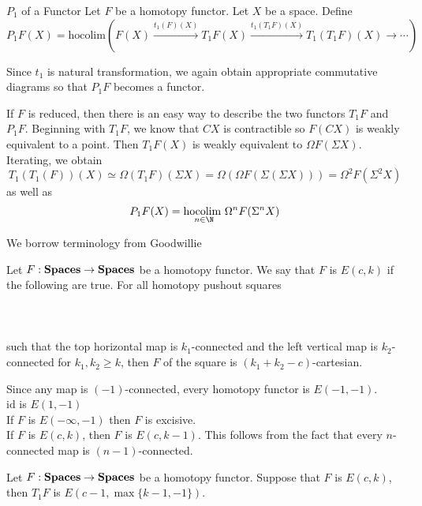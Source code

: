 \documentclass[a4paper]{article}
\begin{document}
\begin{defn}{$P_1$ of a Functor}{} Let $F$ be a homotopy functor. Let $X$ be a space. Define $$P_1F(X)=\text{hocolim}(F(X)\overset{t_1(F)(X)}{\rightarrow}T_1F(X)\overset{t_1(T_1F)(X)}{\rightarrow}T_1(T_1F)(X)\rightarrow\cdots)$$
\end{defn}

Since $t_1$ is natural transformation, we again obtain appropriate commutative diagrams so that $P_1F$ becomes a functor. 

\begin{eg}{}{} If $F$ is reduced, then there is an easy way to describe the two functors $T_1F$ and $P_1F$. Beginning with $T_1F$, we know that $CX$ is contractible so $F(CX)$ is weakly equivalent to a point. Then $T_1F(X)$ is weakly equivalent to $\Omega F(\Sigma X)$. Iterating, we obtain $$T_1(T_1(F))(X)\simeq\Omega (T_1F)(\Sigma X)=\Omega(\Omega F(\Sigma(\Sigma X)))=\Omega^2 F(\Sigma^2 X)$$ as well as $$P_1F(X)=\underset{n\in\N}{\text{hocolim }}\Omega^n F(\Sigma^n X)$$
\end{eg}

We borrow terminology from Goodwillie

\begin{defn}{}{} Let $F:\bold{Spaces}\to\bold{Spaces}$ be a homotopy functor. We say that $F$ is $E(c,k)$ if the following are true. For all homotopy pushout squares \\~\\
\\~\\
such that the top horizontal map is $k_1$-connected and the left vertical map is $k_2$-connected for $k_1,k_2\geq k$, then $F$ of the square is $(k_1+k_2-c)$-cartesian. 
\end{defn}

Since any map is $(-1)$-connected, every homotopy functor is $E(-1,-1)$. \\
$\text{id}$ is $E(1,-1)$\\
If $F$ is $E(-\infty,-1)$ then $F$ is excisive. \\
If $F$ is $E(c,k)$, then $F$ is $E(c,k-1)$. This follows from the fact that every $n$-connected map is $(n-1)$-connected. 

\begin{prp}{}{} Let $F:\bold{Spaces}\to\bold{Spaces}$ be a homotopy functor. Suppose that $F$ is $E(c,k)$, then $T_1F$ is $E(c-1,\max\{k-1,-1\})$. 
\end{prp}
\end{document}
